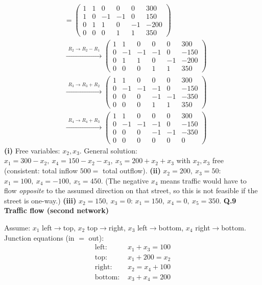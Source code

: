 \begin{align*}
[A|b] &= \left(\begin{array}{ccccc|c}1 & 1 & 0 & 0 & 0 & 300 \\ 1 & 0 & -1 & -1 & 0 & 150 \\ 0 & 1 & 1 & 0 & -1 & -200 \\ 0 & 0 & 0 & 1 & 1 & 350\end{array}\right) \\
&\xrightarrow{\substack{R_2\to R_2-R_1}} \left(\begin{array}{ccccc|c}1 & 1 & 0 & 0 & 0 & 300 \\ 0 & -1 & -1 & -1 & 0 & -150 \\ 0 & 1 & 1 & 0 & -1 & -200 \\ 0 & 0 & 0 & 1 & 1 & 350\end{array}\right) \\
&\xrightarrow{\substack{R_3\to R_3+R_2}} \left(\begin{array}{ccccc|c}1 & 1 & 0 & 0 & 0 & 300 \\ 0 & -1 & -1 & -1 & 0 & -150 \\ 0 & 0 & 0 & -1 & -1 & -350 \\ 0 & 0 & 0 & 1 & 1 & 350\end{array}\right) \\
&\xrightarrow{\substack{R_4\to R_4+R_3}} \left(\begin{array}{ccccc|c}1 & 1 & 0 & 0 & 0 & 300 \\ 0 & -1 & -1 & -1 & 0 & -150 \\ 0 & 0 & 0 & -1 & -1 & -350 \\ 0 & 0 & 0 & 0 & 0 & 0\end{array}\right)
\end{align*}
\textbf{(i)} Free variables: $x_2,x_3$. General solution: $x_1=300-x_2,\ x_4=150-x_2-x_3,\ x_5=200+x_2+x_3$ with $x_2,x_3$ free (consistent: total inflow $500=$ total outflow).
\textbf{(ii)} $x_2=200,\ x_3=50$: $x_1=100,\ x_4=-100,\ x_5=450$. (The negative $x_4$ means traffic would have to flow \emph{opposite} to the assumed direction on that street, so this is not feasible if the street is one-way.)
\textbf{(iii)} $x_2=150,\ x_3=0$: $x_1=150,\ x_4=0,\ x_5=350$.
\medskip\noindent\textbf{Q.9  Traffic flow (second network)}\par\smallskip
Assume: $x_1$ left$\to$top, $x_2$ top$\to$right, $x_3$ left$\to$bottom, $x_4$ right$\to$bottom. Junction equations (in $=$ out):
\begin{align*}
\text{left: }& x_1+x_3=100 \\
\text{top: }& x_1+200=x_2 \\
\text{right: }& x_2=x_4+100 \\
\text{bottom: }& x_3+x_4=200
\end{align*}
